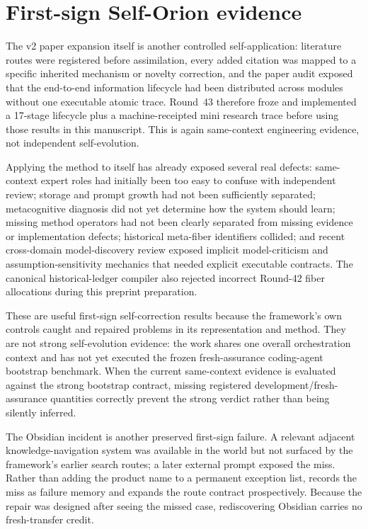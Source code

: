 \section{First-sign Self-Orion evidence}
The v2 paper expansion itself is another controlled self-application: literature routes were registered before assimilation, every added citation was mapped to a specific inherited mechanism or novelty correction, and the paper audit exposed that the end-to-end information lifecycle had been distributed across modules without one executable atomic trace. Round~43 therefore froze and implemented a 17-stage lifecycle plus a machine-receipted mini research trace before using those results in this manuscript. This is again same-context engineering evidence, not independent self-evolution.

Applying the method to itself has already exposed several real defects: same-context expert roles had initially been too easy to confuse with independent review; storage and prompt growth had not been sufficiently separated; metacognitive diagnosis did not yet determine how the system should learn; missing method operators had not been clearly separated from missing evidence or implementation defects; historical meta-fiber identifiers collided; and recent cross-domain model-discovery review exposed implicit model-criticism and assumption-sensitivity mechanics that needed explicit executable contracts. The canonical historical-ledger compiler also rejected incorrect Round-42 fiber allocations during this preprint preparation.

These are useful first-sign self-correction results because the framework's own controls caught and repaired problems in its representation and method. They are not strong self-evolution evidence: the work shares one overall orchestration context and has not yet executed the frozen fresh-assurance coding-agent bootstrap benchmark. When the current same-context evidence is evaluated against the strong bootstrap contract, missing registered development/fresh-assurance quantities correctly prevent the strong verdict rather than being silently inferred.


The Obsidian incident is another preserved first-sign failure. A relevant adjacent knowledge-navigation system was available in the world but not surfaced by the framework's earlier search routes; a later external prompt exposed the miss. Rather than adding the product name to a permanent exception list, \RAKL{} records the miss as failure memory and expands the route contract prospectively. Because the repair was designed after seeing the missed case, rediscovering Obsidian carries no fresh-transfer credit.

